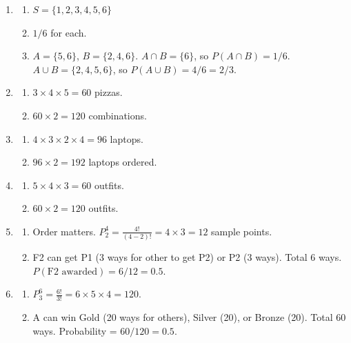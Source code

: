 \documentclass[11pt]{article}
\begin{document}
\begin{enumerate}
\item 
\begin{enumerate}
    \item $S = \{1, 2, 3, 4, 5, 6\}$
    \item $1/6$ for each.
    \item $A = \{5, 6\}$, $B = \{2, 4, 6\}$. $A \cap B = \{6\}$, so $P(A \cap B) = 1/6$. $A \cup B = \{2, 4, 5, 6\}$, so $P(A \cup B) = 4/6 = 2/3$.
\end{enumerate}

\item 
\begin{enumerate}
    \item $3 \times 4 \times 5 = 60$ pizzas.
    \item $60 \times 2 = 120$ combinations.
\end{enumerate}

\item 
\begin{enumerate}
    \item $4 \times 3 \times 2 \times 4 = 96$ laptops.
    \item $96 \times 2 = 192$ laptops ordered.
\end{enumerate}

\item 
\begin{enumerate}
    \item $5 \times 4 \times 3 = 60$ outfits.
    \item $60 \times 2 = 120$ outfits.
\end{enumerate}

\item 
\begin{enumerate}
    \item Order matters. $P_{2}^{4} = \frac{4!}{(4-2)!} = 4 \times 3 = 12$ sample points.
    \item F2 can get P1 (3 ways for other to get P2) or P2 (3 ways). Total $6$ ways. $P(\text{F2 awarded}) = 6/12 = 0.5$.
\end{enumerate}

\item 
\begin{enumerate}
    \item $P_{3}^{6} = \frac{6!}{3!} = 6 \times 5 \times 4 = 120$.
    \item A can win Gold (20 ways for others), Silver (20), or Bronze (20). Total $60$ ways. Probability = $60/120 = 0.5$.
\end{enumerate}


\end{enumerate}
\end{document}
